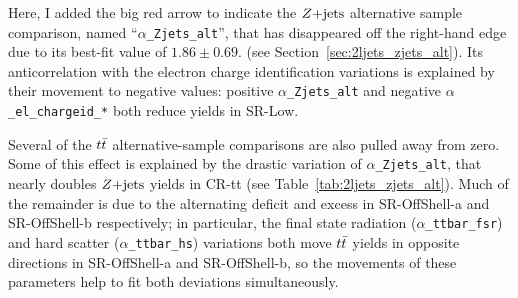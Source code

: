 Here, I added the big red arrow to indicate the $Z\mathrm{+jets}$ alternative sample
comparison, named ``\texttt{$\alpha$\_Zjets\_alt}'', that has disappeared off
the right-hand edge due to its best-fit value of $1.86 \pm 0.69$.
(see Section~\ref{sec:2ljets_zjets_alt}).
Its anticorrelation with the electron charge identification variations is
explained by their movement to negative values:
positive \texttt{$\alpha$\_Zjets\_alt} and negative
\texttt{$\alpha$\_el\_chargeid\_*} both reduce yields in SR-Low.

Several of the $t\bar t$ alternative-sample comparisons are also pulled away
from zero.
Some of this effect is explained by the drastic variation of
\texttt{$\alpha$\_Zjets\_alt}, that nearly doubles $Z\mathrm{+jets}$ yields in CR-tt
(see Table~\ref{tab:2ljets_zjets_alt}).
Much of the remainder is due to the alternating deficit and excess in
SR-OffShell-a and SR-OffShell-b respectively;
in particular, the
final state radiation (\texttt{$\alpha$\_ttbar\_fsr}) and
hard scatter (\texttt{$\alpha$\_ttbar\_hs}) variations both move $t\bar t$
yields in opposite directions in SR-OffShell-a and SR-OffShell-b, so the
movements of these parameters help to fit both deviations simultaneously.

